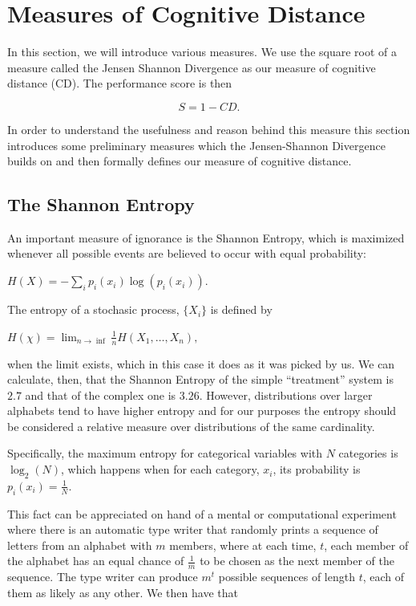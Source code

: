 \section{Measures of Cognitive Distance}

In this section, we will introduce various measures.  We use the square root of a measure called the Jensen Shannon Divergence as our measure of cognitive distance (CD). The performance score is then

\begin{equation}
S = 1 - CD.
\end{equation}

In order to understand the usefulness and reason behind this measure this section introduces some preliminary measures which the Jensen-Shannon Divergence builds on and then formally defines our measure of cognitive distance.    
  
\subsection{The Shannon Entropy}

An important measure of ignorance is the Shannon Entropy, which is maximized whenever all possible events are believed to occur with equal probability:

$H(X)=-\sum_ip_i(x_i)\log(p_i(x_i)).$

The entropy of a stochasic process, $\{X_i\}$ is defined by 

$H(\chi)=\lim_{n\rightarrow\inf}\frac{1}{n}H(X_1, \ldots, X_n),$

when the limit exists, which in this case it does as it was picked by us. 
We can calculate, then, that the Shannon Entropy of the simple ``treatment'' system is $2.7$ and that of the complex one is $3.26$. However, distributions over larger alphabets tend to have higher entropy and for our purposes the entropy should be considered a relative measure over distributions of the same cardinality. 

Specifically, the maximum entropy for categorical variables with $N$ categories is $\log_2(N)$, which happens when for each category, $x_i$, its probability is $p_i(x_i)=\frac{1}{N}$. 

This fact can be appreciated on hand of a mental or computational experiment \citep{Cover13} where there is an automatic type writer that randomly prints a sequence of letters from an alphabet with $m$ members, where at each time, $t$, each member of the alphabet has an equal chance of $\frac{1}{m}$ to be chosen as the next member of the sequence. The type writer can produce $m^t$ possible sequences of length $t$, each of them as likely as any other. We then have that 

